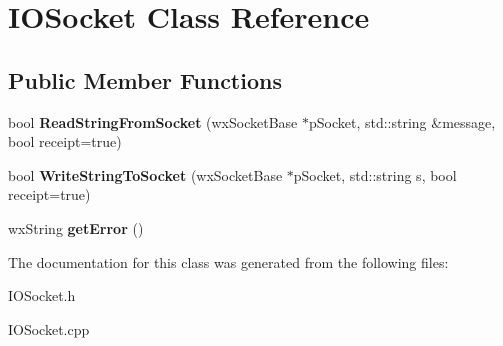 \hypertarget{class_i_o_socket}{}\section{I\+O\+Socket Class Reference}
\label{class_i_o_socket}
\subsection*{Public Member Functions}
\begin{DoxyCompactItemize}
\item 
\mbox{\label{class_i_o_socket_a7e788f648d2ebaf893c638f876511329}} 
bool {\bfseries Read\+String\+From\+Socket} (wx\+Socket\+Base $\ast$p\+Socket, std\+::string \&message, bool receipt=true)
\item 
\mbox{\label{class_i_o_socket_a080ed452f8ef65b844544115f8036a7a}} 
bool {\bfseries Write\+String\+To\+Socket} (wx\+Socket\+Base $\ast$p\+Socket, std\+::string s, bool receipt=true)
\item 
\mbox{\label{class_i_o_socket_a73e97732b0052adaa5ca39d19ac4cc25}} 
wx\+String {\bfseries get\+Error} ()
\end{DoxyCompactItemize}


The documentation for this class was generated from the following files\+:\begin{DoxyCompactItemize}
\item 
I\+O\+Socket.\+h\item 
I\+O\+Socket.\+cpp\end{DoxyCompactItemize}
